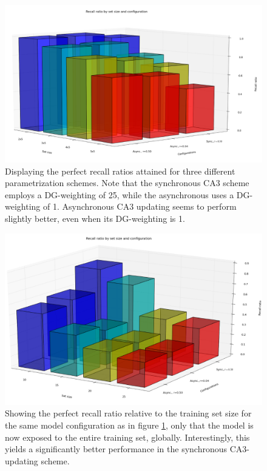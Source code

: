 \begin{figure}
    \centering
    \includegraphics[width=13cm]{fig/3d_perfect_recall_by_set_size_and_configs_hpc_local_cut}
    \caption{Displaying the perfect recall ratios attained for three different parametrization schemes. Note that the synchronous CA3 scheme employs a DG-weighting of 25, while the asynchronous uses a DG-weighting of 1. Asynchronous CA3 updating seems to perform slightly better, even when its DG-weighting is 1.}
    \label{fig:3d_perfect_recall_by_set_size_and_configs_hpc_local}
\end{figure}

\begin{figure}
    \centering
    \includegraphics[width=13cm]{fig/3d_perfect_recall_by_set_size_and_configs_hpc_global_cut}
    \caption{Showing the perfect recall ratio relative to the training set size for the same model configuration as in figure \ref{fig:3d_perfect_recall_by_set_size_and_configs_hpc_local}, only that the model is now exposed to the entire training set, globally. Interestingly, this yields a significantly better performance in the synchronous CA3-updating scheme.}
    \label{fig:3d_perfect_recall_by_set_size_and_configs_hpc_global}
\end{figure}

